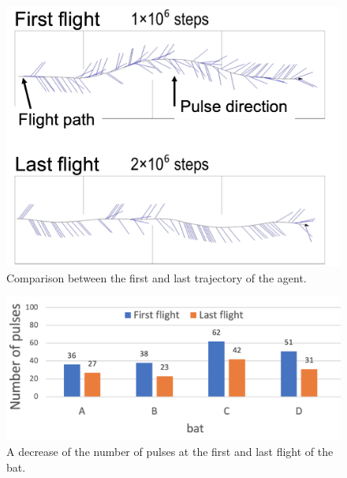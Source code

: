 \documentclass[../main]{subfiles}
\begin{document}
\newpage
{}
\begin{figure}[H]
  \centering
  \vfill
  \includegraphics[width=12cm]{figures/agent_trajectory.png}
  \caption{
    Comparison between the first and last trajectory of the agent.
  }\label{fig:agent_trajectory}
\end{figure}

\newpage
{}
\begin{figure}[H]
  \centering
  \vfill
  \includegraphics[width=15cm]{figures/bat_pulses.png}
  \caption{
    A decrease of the number of pulses at the first and last 
    flight of the bat.
  }\label{fig:bat_pulse}
\end{figure}
\end{document}
